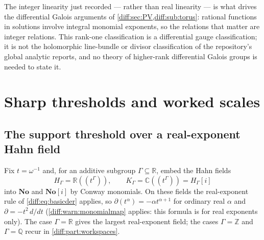 \documentclass[11pt,letterpaper]{article}
\numberwithin{equation}{section}
\theoremstyle{definition}
\theoremstyle{remark}
\newcommand{\No}{\mathbf{No}}
\newcommand{\SC}{\mathbf{No}[i]}
\newcommand{\R}{\mathbb R}
\newcommand{\C}{\mathbb C}
\newcommand{\Q}{\mathbb Q}
\newcommand{\Z}{\mathbb Z}
\newcommand{\der}{\partial}
\begin{document}
The integer linearity just recorded --- rather than real linearity --- is what
drives the differential Galois arguments of
\cref{diff:sec:PV,diff:sub:torus}: rational functions in solutions involve
integral monomial exponents, so the relations that matter are integer
relations. This rank-one classification is a differential gauge
classification; it is not the holomorphic line-bundle or divisor
classification of the repository's global analytic reports, and no theory of
higher-rank differential Galois groups is needed to state it.

\section{Sharp thresholds and worked scales}
\label{diff:sec:thresholds}

\subsection{The support threshold over a real-exponent Hahn field}
\label{diff:sub:supportthreshold}

Fix $t=\omega^{-1}$ and, for an additive subgroup $\Gamma\subseteq\R$, embed
the Hahn fields
\[
 H_{\Gamma}=\R((t^{\Gamma})),\qquad
 K_{\Gamma}=\C((t^{\Gamma}))=H_{\Gamma}[i]
\]
into $\No$ and $\SC$ by Conway monomials. On these fields the real-exponent
rule of \cref{diff:eq:basicder} applies, so $\der(t^{\alpha})=-\alpha t^{\alpha+1}$
for ordinary real $\alpha$ and $\der=-t^{2}\,d/dt$
(\cref{diff:warn:monomialmap} applies: this formula is for real exponents
only). The case $\Gamma=\R$ gives the largest real-exponent field; the cases
$\Gamma=\Z$ and $\Gamma=\Q$ recur in \cref{diff:part:workspaces}.
\end{document}
